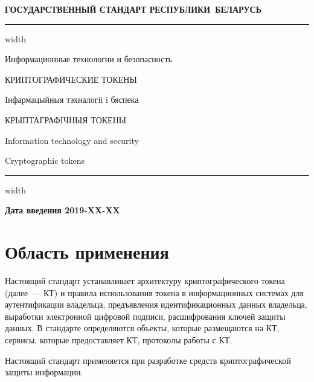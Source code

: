 \newpage
\setcounter{page}{1}
\pagestyle{headings}

\begin{center}
{\bfseries
ГОСУДАРСТВЕННЫЙ СТАНДАРТ РЕСПУБЛИКИ~БЕЛАРУСЬ
\vskip 2pt
\hrule width\textwidth

\vskip 9pt

Информационные технологии и безопасность

КРИПТОГРАФИЧЕСКИЕ ТОКЕНЫ

\vskip 9pt

Iнфармацыйныя тэхналогii i бяспека

КРЫПТАГРАФIЧНЫЯ ТОКЕНЫ
} %

\vskip 9pt

Information technology and security

Cryptographic tokens

\vskip 4pt                
\hrule width \textwidth
\end{center}

\mbox{}\hfill{\bfseries Дата введения 2019-XX-XX}

\chapter{Область применения}

Настоящий стандарт устанавливает архитектуру
криптографического токена (далее~--- КТ) и правила 
использования токена в информационных системах для аутентификации владельца, 
предъявления идентификационных данных владельца, выработки электронной цифровой 
подписи, расшифрования ключей защиты данных.
%
В стандарте определяются объекты, которые размещаются на КТ,
сервисы, которые предоставляет КТ, протоколы работы с КТ.

Настоящий стандарт применяется при разработке средств криптографической 
защиты информации.

